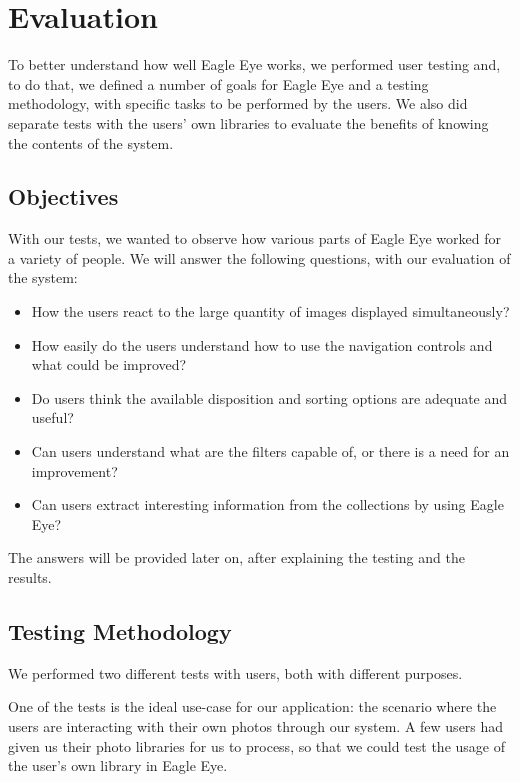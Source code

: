 \chapter{Evaluation} %
\label{chapter:evaluation}


To better understand how well Eagle Eye works, we performed user testing and, to do that, we defined a number of goals for Eagle Eye and a testing methodology, with specific tasks to be performed by the users. We also did separate tests with the users' own libraries to evaluate the benefits of knowing the contents of the system.


\section{Objectives}

With our tests, we wanted to observe how various parts of Eagle Eye worked for a variety of people. 
We will answer the following questions, with our evaluation of the system:

\begin{itemize}
\item How the users react to the large quantity of images displayed simultaneously?
\item How easily do the users understand how to use the navigation controls and what could be improved?
\item Do users think the available disposition and sorting options are adequate and useful?
\item Can users understand what are the filters capable of, or there is a need for an improvement?
\item Can users extract interesting information from the collections by using Eagle Eye?
\end{itemize}

The answers will be provided later on, after explaining the testing and the results.

\section{Testing Methodology}

We performed two different tests with users, both with different purposes.

One of the tests is the ideal use-case for our application: the scenario where the users are interacting with their own photos through our system. A few users had given us their photo libraries for us to process, so that we could test the usage of the user's own library in Eagle Eye.


